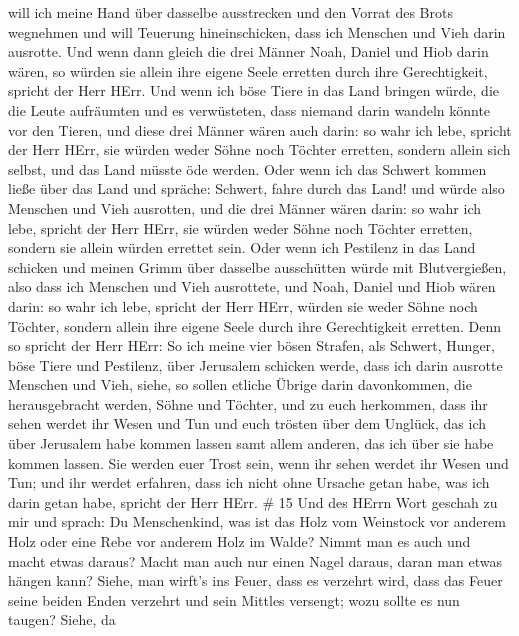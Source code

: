 will ich meine Hand über dasselbe ausstrecken und den Vorrat des Brots
wegnehmen und will Teuerung hineinschicken, dass ich Menschen und Vieh
darin ausrotte.  Und wenn dann gleich die drei Männer Noah,
Daniel und Hiob darin wären, so würden sie allein ihre eigene Seele
erretten durch ihre Gerechtigkeit, spricht der Herr HErr. 
Und wenn ich böse Tiere in das Land bringen würde, die die Leute
aufräumten und es verwüsteten, dass niemand darin wandeln könnte vor den
Tieren,  und diese drei Männer wären auch darin: so wahr
ich lebe, spricht der Herr HErr, sie würden weder Söhne noch Töchter
erretten, sondern allein sich selbst, und das Land müsste öde werden.
 Oder wenn ich das Schwert kommen ließe über das Land und
spräche: Schwert, fahre durch das Land! und würde also Menschen und Vieh
ausrotten,  und die drei Männer wären darin: so wahr ich
lebe, spricht der Herr HErr, sie würden weder Söhne noch Töchter
erretten, sondern sie allein würden errettet sein.  Oder
wenn ich Pestilenz in das Land schicken und meinen Grimm über dasselbe
ausschütten würde mit Blutvergießen, also dass ich Menschen und Vieh
ausrottete,  und Noah, Daniel und Hiob wären darin: so wahr
ich lebe, spricht der Herr HErr, würden sie weder Söhne noch Töchter,
sondern allein ihre eigene Seele durch ihre Gerechtigkeit erretten.
 Denn so spricht der Herr HErr: So ich meine vier bösen
Strafen, als Schwert, Hunger, böse Tiere und Pestilenz, über Jerusalem
schicken werde, dass ich darin ausrotte Menschen und Vieh, 
siehe, so sollen etliche Übrige darin davonkommen, die herausgebracht
werden, Söhne und Töchter, und zu euch herkommen, dass ihr sehen werdet
ihr Wesen und Tun und euch trösten über dem Unglück, das ich über
Jerusalem habe kommen lassen samt allem anderen, das ich über sie habe
kommen lassen.  Sie werden euer Trost sein, wenn ihr sehen
werdet ihr Wesen und Tun; und ihr werdet erfahren, dass ich nicht ohne
Ursache getan habe, was ich darin getan habe, spricht der Herr HErr. \#
15  Und des HErrn Wort geschah zu mir und sprach:
 Du Menschenkind, was ist das Holz vom Weinstock vor anderem
Holz oder eine Rebe vor anderem Holz im Walde?  Nimmt man es
auch und macht etwas daraus? Macht man auch nur einen Nagel daraus,
daran man etwas hängen kann?  Siehe, man wirft's ins Feuer,
dass es verzehrt wird, dass das Feuer seine beiden Enden verzehrt und
sein Mittles versengt; wozu sollte es nun taugen?  Siehe, da
